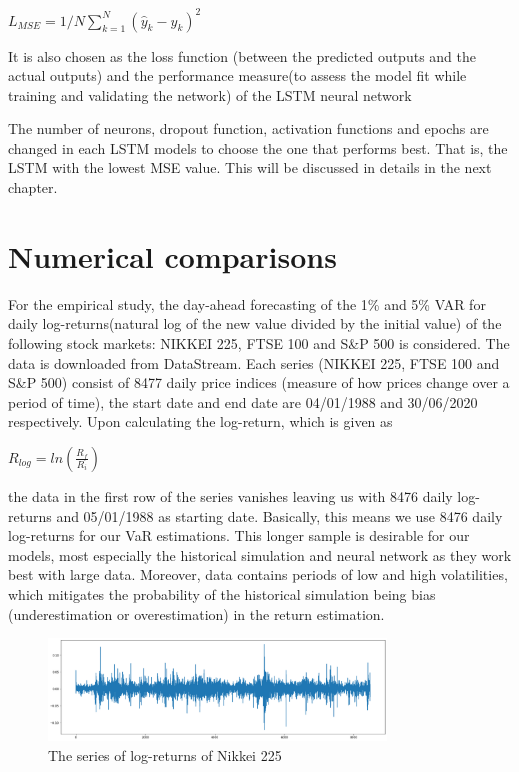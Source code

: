 \documentclass[a4paper,11pt,oneside]{book}
\begin{document}
\begin{itemize}
\begin{center}
	$L_{MSE} = 1/N\sum_{k=1}^{N} ({\hat{y}}_{k}-y_k)^2$
\end{center}
It is also chosen as the loss function (between the predicted outputs and the actual outputs) and the performance measure(to assess the model fit while
training and validating the network) of the
LSTM neural network
\end{itemize}

The number of neurons, dropout function, activation functions and epochs are changed in each LSTM models to choose the one that performs best. That is, the LSTM with the lowest MSE value. This will be discussed in details in the next chapter.


\chapter{Numerical comparisons}
For the empirical study, the day-ahead forecasting of the 1\% and 5\% VAR for daily log-returns(natural log of the new value divided by the initial value) of the following stock markets: NIKKEI 225, FTSE 100 and S\&P 500 is considered. The data is downloaded from DataStream. Each series (NIKKEI 225, FTSE 100 and S\&P 500) consist of 8477 daily price indices (measure of how prices change over a period of time), the start date and end date are 04/01/1988 and 30/06/2020 respectively. Upon calculating the log-return, which is given as 

\begin{center}
	$R_{log} = ln(\frac{R_f}{R_i})$
\end{center}
the data in the first row of the series vanishes leaving us with 8476 daily log-returns and 05/01/1988 as starting date. Basically, this means we use 8476 daily log-returns for our VaR estimations. This longer sample is desirable for our models, most especially the historical simulation and neural network as they work best with large data. Moreover, data contains periods of low and high volatilities, which mitigates the probability of the historical simulation being bias (underestimation or overestimation) in the return estimation.\newline

\begin{figure}[!h]
	\centering
	\includegraphics[width=0.8\textwidth]{figures/logNikkei}
	\caption{The series of log-returns of Nikkei 225}
	\label{logNikkei}
\end{figure}
\end{document}

